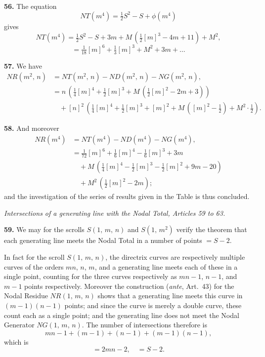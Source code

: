 \documentclass[11pt,a4paper]{article}
\begin{document}
\medskip

\textbf{56.} The equation
\[
NT(m^4) = \tfrac{1}{2}S^2 - S + \phi(m^4)
\]
gives
\[
NT(m^4) = \tfrac{1}{2}S^2 - S + 3m + M\,(\tfrac{1}{2}[m]^3 - 4m + 11) + M^2,
\]
\[
= \tfrac{1}{18}[m]^6 + \tfrac{1}{3}[m]^3 + M^2 + 3m + \ldots
\]

\medskip

\textbf{57.} We have
\begin{align*}
NR(m^2,\,n) &= NT(m^2,\,n) - ND(m^2,\,n) - NG(m^2,\,n),\\
            &= n\,(\tfrac{1}{4}[m]^4 + \tfrac{1}{2}[m]^3 + M\,(\tfrac{1}{2}[m]^2 - 2m + 3))\\
            &\quad + [n]^2\,(\tfrac{1}{4}[m]^4 + \tfrac{1}{2}[m]^3 + [m]^2 + M\,([m]^2 - \tfrac{1}{2}) + M^2 \cdot \tfrac{1}{2}).
\end{align*}

\medskip

\textbf{58.} And moreover
\begin{align*}
NR(m^4) &= NT(m^4) - ND(m^4) - NG(m^4),\\
        &= \tfrac{1}{72}[m]^6 + \tfrac{1}{6}[m]^4 - \tfrac{1}{6}[m]^3 + 3m\\
        &\quad + M\,(\tfrac{1}{4}[m]^4 - \tfrac{1}{2}[m]^3 - \tfrac{1}{2}[m]^2 + 9m - 20)\\
        &\quad + M^2\,(\tfrac{1}{2}[m]^2 - 2m);
\end{align*}
and the investigation of the series of results given in the Table is thus concluded.

\bigskip

\begin{center}
\textit{Intersections of a generating line with the Nodal Total, Articles 59 to 63.}
\end{center}

\textbf{59.} We may for the scrolls $S(1,\,m,\,n)$ and $S(1,\,m^2)$ verify the theorem that each generating line meets the Nodal Total in a number of points $= S - 2$.

\medskip

In fact for the scroll $S(1,\,m,\,n)$, the directrix curves are respectively multiple curves of the orders $mn$, $n$, $m$, and a generating line meets each of these in a single point, counting for the three curves respectively as $mn - 1$, $n - 1$, and $m - 1$ points respectively. Moreover the construction (\textit{ante}, Art.~43) for the Nodal Residue $NR(1,\,m,\,n)$ shows that a generating line meets this curve in $(m-1)(n-1)$ points; and since the curve is merely a double curve, these count each as a single point; and the generating line does not meet the Nodal Generator $NG(1,\,m,\,n)$. The number of intersections therefore is
\[
mn - 1 + (m-1) + (n-1) + (m-1)(n-1),
\]
which is
\[
= 2mn - 2,\quad = S - 2.
\]
\end{document}
